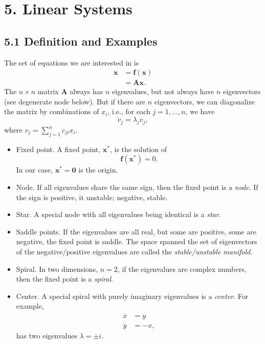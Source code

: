 \documentclass{book}
\begin{document}
\chapter{5. Linear Systems}

\section{5.1 Definition and Examples}

The set of equations we are interested in is
$$
\begin{aligned}
  \mathbf {\dot x}
  &= \mathbf f(\mathbf x) \\
  &= \mathbf A \mathbf x.
\end{aligned}
$$
The $n\times n$ matrix $\mathbf A$ always has $n$ eigenvalues,
but not always have $n$ eigenvectors (see degenerate node below).
But if there are $n$ eigenvectors,
we can diagonalize the matrix by combinations of $x_i$,
i.e., for each $j = 1, \dots, n$, we have
$$
\dot v_j = \lambda_j v_j,
$$
where $v_j = \sum_{j = 1}^n c_{ji} x_i$.

\begin{itemize}

\item
Fixed point. A fixed point, $\mathbf x^*$, is the solution of
$$
\mathbf f(\mathbf x^*) = 0.
$$
In our case, $\mathbf x^* = \mathbf 0$ is the origin.
\\

\item
Node.
If all eigenvalues share the same sign, then the fixed point is a \emph{node}.
If the sign is positive, it unstable; negative, stable.
\\

\item
Star.
A special node with all eigenvalues being identical is a \emph{star}.

\item
Saddle points.
If the eigenvalues are all real, but some are positive, some are negative, the fixed point is saddle.
The space spanned the set of eigenvectors of the negative/positive eigenvalues are called the \emph{stable/unstable manifold}.

\item
Spiral.
In two dimensions, $n = 2$,
if the eigenvalues are complex numbers, then the fixed point is a \emph{spiral}.

\item
Center.
A special spiral with purely imaginary eigenvalues is a \emph{center}. For example,
\begin{align*}
  \dot x &= y \\
  \dot y &= -x,
\end{align*}
has two eigenvalues $\lambda = \pm i$.

\end{itemize}
\end{document}
